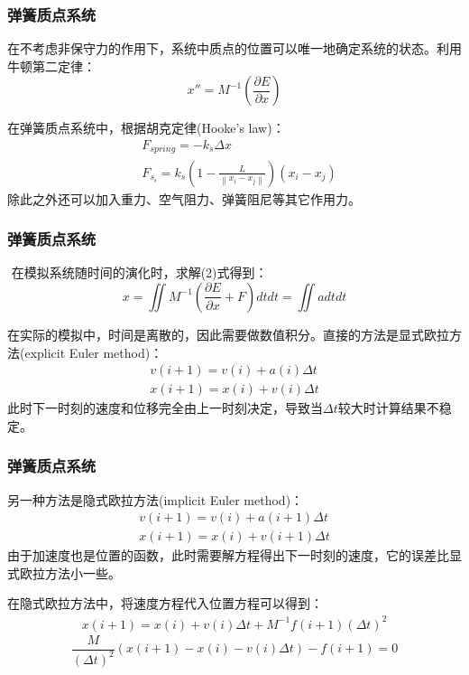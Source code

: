 \documentclass[aspectratio=43]{ctexbeamer}
\begin{document}
\begin{frame}
  \frametitle{弹簧质点系统}
        在不考虑非保守力的作用下，系统中质点的位置可以唯一地确定系统的状态。利用牛顿第二定律：
        \begin{equation}
			x''=M^{-1}(\frac{\partial E}{\partial x})
        \end{equation}

		在弹簧质点系统中，根据胡克定律(Hooke's law)：
        \begin{equation}
		\begin{split}
			&F_{spring}=-k_s\Delta x \\
			&F_{s_i}=k_s(1-\frac{L}{\left \| x_i-x_j \right \| })(x_i-x_j)
		\end{split}
        \end{equation}
​		除此之外还可以加入重力、空气阻力、弹簧阻尼等其它作用力。
\end{frame}

\begin{frame}
  \frametitle{弹簧质点系统}
​		在模拟系统随时间的演化时，求解(2)式得到：
        \begin{equation}
            x = \iint M^{-1}(\frac{\partial E}{\partial x}+F)dtdt=\iint adtdt
        \end{equation}

		在实际的模拟中，时间是离散的，因此需要做数值积分。直接的方法是显式欧拉方法(explicit Euler method)：
        \begin{equation}
		\begin{split}
			v(i+1) = v(i) + a(i)\Delta t \\
			x(i+1) = x(i) + v(i)\Delta t
		\end{split}
        \end{equation}
		此时下一时刻的速度和位移完全由上一时刻决定，导致当$\Delta t$较大时计算结果不稳定。
\end{frame}

\begin{frame}
  \frametitle{弹簧质点系统}
		另一种方法是隐式欧拉方法(implicit Euler method)：
        \begin{equation}
		\begin{split}
			v(i+1) = v(i) + a(i+1)\Delta t \\
			x(i+1) = x(i) + v(i+1)\Delta t
		\end{split}
        \end{equation}
		由于加速度也是位置的函数，此时需要解方程得出下一时刻的速度，它的误差比显式欧拉方法小一些。

		在隐式欧拉方法中，将速度方程代入位置方程可以得到：
		\begin{equation}
		\begin{split}
			x(i+1)= x(i) + v(i)\Delta t + M^{-1}f(i+1)(\Delta t)^2
		\end{split}
		\end{equation}
        \begin{equation}
			\frac{M}{(\Delta t)^2}(x(i+1)-x(i)-v(i)\Delta t) - f(i+1)=0
        \end{equation}
\end{frame}
\end{document}
